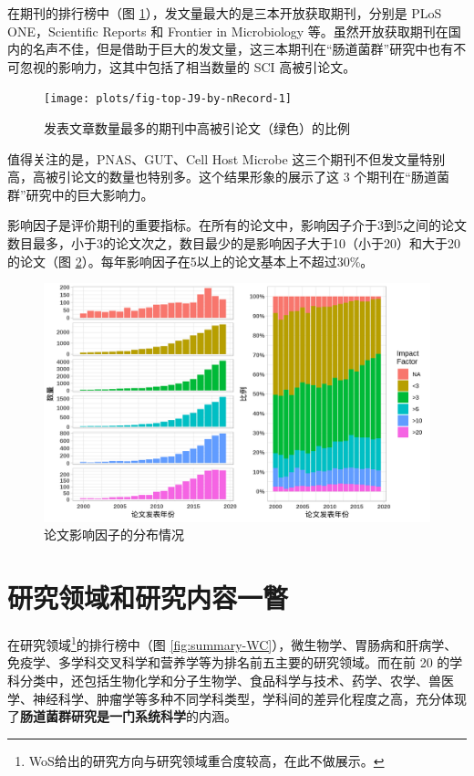 \documentclass[]{ctexbook}
\begin{document}
在期刊的排行榜中（图 \ref{fig:fig-top-J9-by-nRecord}），发文量最大的是三本开放获取期刊，分别是 PLoS ONE，Scientific Reports 和 Frontier in Microbiology 等。虽然开放获取期刊在国内的名声不佳，但是借助于巨大的发文量，这三本期刊在``肠道菌群''研究中也有不可忽视的影响力，这其中包括了相当数量的 SCI 高被引论文。

\begin{figure}
\texttt{[image: plots/fig-top-J9-by-nRecord-1]} \caption{发表文章数量最多的期刊中高被引论文（绿色）的比例}\label{fig:fig-top-J9-by-nRecord}
\end{figure}

值得关注的是，PNAS、GUT、Cell Host Microbe 这三个期刊不但发文量特别高，高被引论文的数量也特别多。这个结果形象的展示了这 3 个期刊在``肠道菌群''研究中的巨大影响力。

影响因子是评价期刊的重要指标。在所有的论文中，影响因子介于3到5之间的论文数目最多，小于3的论文次之，数目最少的是影响因子大于10（小于20）和大于20的论文（图 \ref{fig:all-article-group-by-IF}）。每年影响因子在5以上的论文基本上不超过30\%。

\begin{figure}
\includegraphics[width=1\linewidth]{plots/all-article-group-by-IF-1} \caption{论文影响因子的分布情况}\label{fig:all-article-group-by-IF}
\end{figure}

\hypertarget{ux7814ux7a76ux9886ux57dfux548cux7814ux7a76ux5185ux5bb9ux4e00ux77a5}{%
\section{研究领域和研究内容一瞥}\label{ux7814ux7a76ux9886ux57dfux548cux7814ux7a76ux5185ux5bb9ux4e00ux77a5}}

在研究领域\footnote{WoS给出的研究方向与研究领域重合度较高，在此不做展示。}的排行榜中（图 \ref{fig:summary-WC}），微生物学、胃肠病和肝病学、免疫学、多学科交叉科学和营养学等为排名前五主要的研究领域。而在前 20 的学科分类中，还包括生物化学和分子生物学、食品科学与技术、药学、农学、兽医学、神经科学、肿瘤学等多种不同学科类型，学科间的差异化程度之高，充分体现了\textbf{肠道菌群研究是一门系统科学}的内涵。
\end{document}
